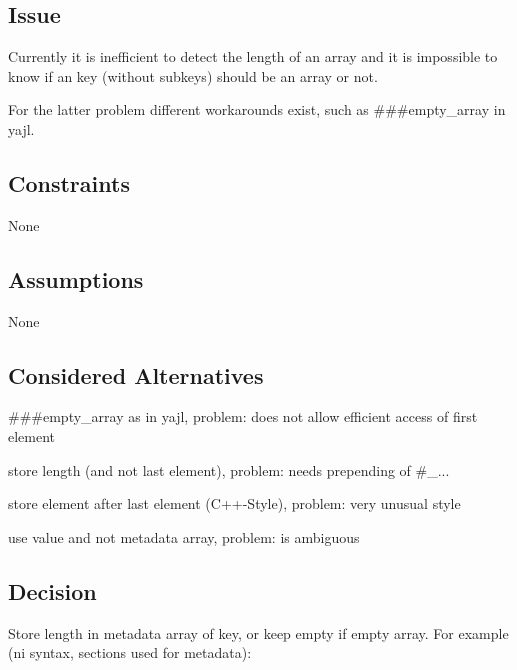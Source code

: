 \subsection*{Issue}

Currently it is inefficient to detect the length of an array and it is impossible to know if an key (without subkeys) should be an array or not.

For the latter problem different workarounds exist, such as {\ttfamily \#\#\#empty\+\_\+array} in {\ttfamily yajl}.

\subsection*{Constraints}


\begin{DoxyItemize}
\item None
\end{DoxyItemize}

\subsection*{Assumptions}


\begin{DoxyItemize}
\item None
\end{DoxyItemize}

\subsection*{Considered Alternatives}


\begin{DoxyItemize}
\item {\ttfamily \#\#\#empty\+\_\+array} as in {\ttfamily yajl}, problem\+: does not allow efficient access of first element
\item store length (and not last element), problem\+: needs prepending of {\ttfamily \#\+\_\+...}
\item store element after last element (C++-\/\+Style), problem\+: very unusual style
\item use value and not metadata array, problem\+: is ambiguous
\end{DoxyItemize}

\subsection*{Decision}

Store length in metadata {\ttfamily array} of key, or keep empty if empty array. For example ({\ttfamily ni syntax}, sections used for metadata)\+:


